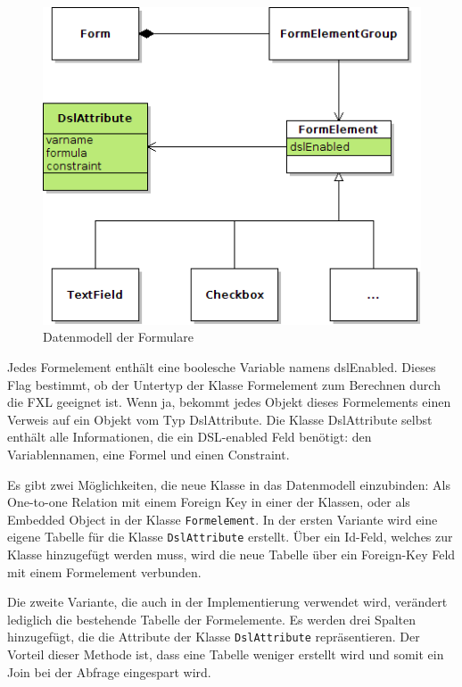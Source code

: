 \begin{figure}[ht]
\begin{center}
 
\includegraphics[scale=0.7]{figures/uml_datenmodell_neu}
\end{center}

\caption{Datenmodell der Formulare}
\label{abb_uml_datenmodell}
\end{figure}

Jedes Formelement enthält eine boolesche Variable namens dslEnabled. Dieses Flag bestimmt, ob der Untertyp der Klasse Formelement zum Berechnen durch die FXL geeignet ist. Wenn ja, bekommt jedes Objekt dieses Formelements einen Verweis auf ein Objekt vom Typ DslAttribute. Die Klasse DslAttribute selbst enthält alle Informationen, die ein DSL-enabled Feld benötigt: den Variablennamen, eine Formel und einen Constraint. 

Es gibt zwei Möglichkeiten, die neue Klasse in das Datenmodell einzubinden: Als One-to-one Relation mit einem Foreign Key in einer der Klassen, oder als Embedded Object in der Klasse \texttt{Formelement}. In der ersten Variante wird eine eigene Tabelle für die Klasse \texttt{DslAttribute} erstellt. Über ein Id-Feld, welches zur Klasse hinzugefügt werden muss, wird die neue Tabelle über ein Foreign-Key Feld mit einem Formelement verbunden.

Die zweite Variante, die auch in der Implementierung verwendet wird, verändert lediglich die bestehende Tabelle der Formelemente. Es werden drei Spalten hinzugefügt, die die Attribute der Klasse \texttt{DslAttribute} repräsentieren. Der Vorteil dieser Methode ist, dass eine Tabelle weniger erstellt wird und somit ein Join bei der Abfrage eingespart wird.

